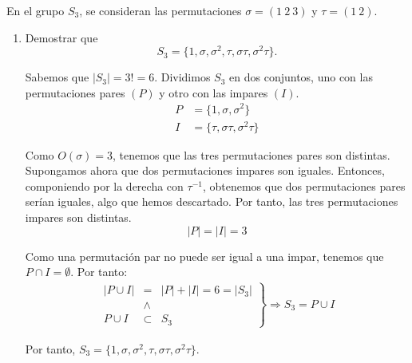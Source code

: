\begin{ejercicio}\label{ej:2.19}
    En el grupo $S_3$, se consideran las permutaciones $\sigma = (1\ 2\ 3)$ y $\tau = (1\ 2)$.
    \begin{enumerate}
        \item Demostrar que
        $$S_3 = \{1, \sigma, \sigma^2, \tau, \sigma\tau, \sigma^2\tau\}.$$


        Sabemos que $|S_3|=3!=6$. Dividimos $S_3$ en dos conjuntos, uno con las permutaciones pares $(P)$ y otro con las impares $(I)$.
        \begin{align*}
            P&=\{1,\sigma,\sigma^2\}\\
            I&=\{\tau,\sigma \tau,\sigma^2 \tau\}
        \end{align*}

        Como $O(\sigma)=3$, tenemos que las tres permutaciones pares son distintas. Supongamos ahora que dos permutaciones impares son iguales. Entonces, componiendo por la derecha con $\tau^{-1}$, obtenemos que dos permutaciones pares serían iguales, algo que hemos descartado. Por tanto, las tres permutaciones impares son distintas.
        \begin{equation*}
            |P|=|I|=3
        \end{equation*}
        
        Como una permutación par no puede ser igual a una impar, tenemos que $P\cap I=\emptyset$. Por tanto:
        \begin{align*}
            \left.\begin{array}{rcl}
                |P\cup I|&=&|P|+|I|=6=|S_3|\\&\land&\\
                P\cup I&\subset&S_3
            \end{array}\right\}\Longrightarrow S_3=P\cup I
        \end{align*}

        Por tanto, $S_3 = \{1, \sigma, \sigma^2, \tau, \sigma\tau, \sigma^2\tau\}$.
        

\end{enumerate}
\end{ejercicio}

